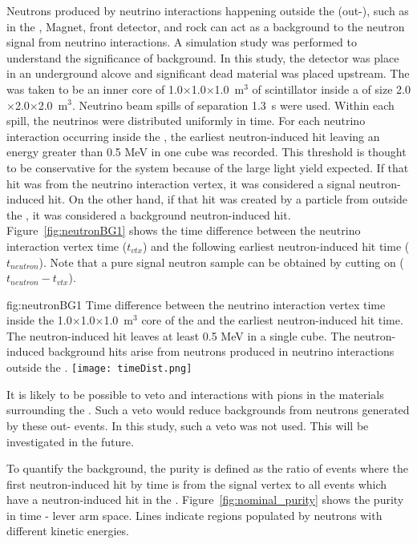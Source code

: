  Neutrons produced by neutrino interactions happening outside the   (out-), such as in the , Magnet, front detector, and rock can act as a background to the neutron signal from neutrino interactions. 
A simulation study was performed to understand the significance of background. In this study, the  detector was place in an underground alcove and significant dead material was placed upstream.  The  was taken to be an inner core of 1.0$\times$1.0$\times$1.0~m$^{3}$ of scintillator inside a  of size 2.0$\times$2.0$\times$2.0~m$^{3}$.  Neutrino beam spills of separation 1.3~s were used.  Within each spill, the neutrinos were distributed uniformly in time.
For each neutrino interaction occurring inside the ,  
 the earliest neutron-induced hit leaving an energy greater than 0.5 MeV in one cube was recorded. This threshold is thought to be conservative for the  system because of the large light yield expected.  If that hit was from the neutrino interaction vertex, it was considered a signal neutron-induced hit. On the other hand, if that hit was created by a particle from outside the , it was considered a background neutron-induced hit.
Figure~\ref{fig:neutronBG1} shows the time difference between the neutrino interaction vertex time ($t_{vtx}$) and the following earliest neutron-induced hit time ($t_{neutron}$). 
Note that a pure signal neutron sample can be obtained by cutting on ($t_{neutron} - t_{vtx}$). 

\begin{dunefigure}{fig:neutronBG1}
{Time difference between the neutrino interaction vertex time inside the 1.0$\times$1.0$\times$1.0~m$^{3}$  core of the  and the earliest neutron-induced hit time. The neutron-induced hit leaves at least 0.5 MeV in a single cube. The neutron-induced background hits arise from neutrons produced in neutrino interactions outside the .}
  \texttt{[image: timeDist.png]}
\end{dunefigure}

It is likely to be possible to veto   and  interactions with pions in the materials surrounding the .  Such a veto would reduce backgrounds from neutrons generated by these out- events.  In this study, such a veto was not used. This will be investigated in the future.

To quantify the background, the purity is defined as the ratio of events where the first neutron-induced hit by time is from the signal vertex to all events which have a neutron-induced hit in the . 
Figure~\ref{fig:nominal_purity} shows the purity in time - lever arm space. Lines indicate regions populated by neutrons with different kinetic energies.

